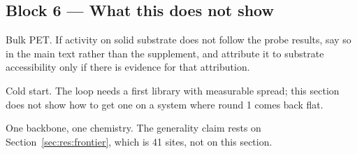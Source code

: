 \subsection*{Block 6 --- What this does not show}
\begin{planlist}
  \item Bulk PET. If activity on solid substrate does not follow the probe
        results, say so in the main text rather than the supplement, and
        attribute it to substrate accessibility only if there is evidence for
        that attribution.
  \item Cold start. The loop needs a first library with measurable spread; this
        section does not show how to get one on a system where round 1 comes
        back flat.
  \item One backbone, one chemistry. The generality claim rests on
        Section~\ref{sec:res:frontier}, which is 41 sites, not on this section.
\end{planlist}

